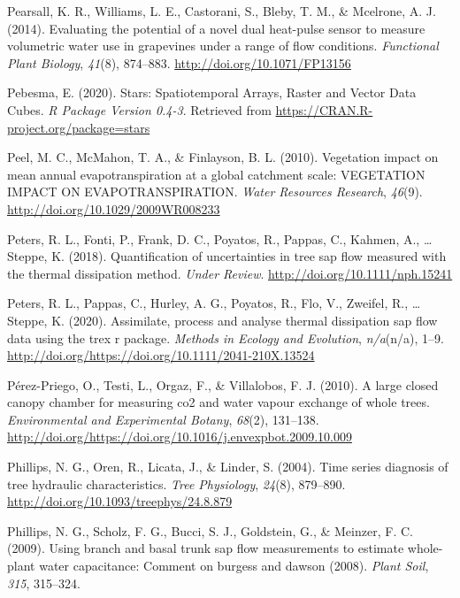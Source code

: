 \documentclass[11pt,twoside]{reedthesis}
\begin{document}
\hypertarget{ref-Pearsall2014}{}
Pearsall, K. R., Williams, L. E., Castorani, S., Bleby, T. M., \&
Mcelrone, A. J. (2014). Evaluating the potential of a novel dual
heat-pulse sensor to measure volumetric water use in grapevines under a
range of flow conditions. \emph{Functional Plant Biology}, \emph{41}(8),
874--883. \url{http://doi.org/10.1071/FP13156}

\hypertarget{ref-pebesma_stars_2020}{}
Pebesma, E. (2020). Stars: Spatiotemporal Arrays, Raster and Vector Data
Cubes. \emph{R Package Version 0.4-3}. Retrieved from
\url{https://CRAN.R-project.org/package=stars}

\hypertarget{ref-peel_vegetation_2010}{}
Peel, M. C., McMahon, T. A., \& Finlayson, B. L. (2010). Vegetation
impact on mean annual evapotranspiration at a global catchment scale:
VEGETATION IMPACT ON EVAPOTRANSPIRATION. \emph{Water Resources
Research}, \emph{46}(9). \url{http://doi.org/10.1029/2009WR008233}

\hypertarget{ref-Peters2018}{}
Peters, R. L., Fonti, P., Frank, D. C., Poyatos, R., Pappas, C., Kahmen,
A., \ldots{} Steppe, K. (2018). Quantification of uncertainties in tree
sap flow measured with the thermal dissipation method. \emph{Under
Review}. \url{http://doi.org/10.1111/nph.15241}

\hypertarget{ref-Richard2020}{}
Peters, R. L., Pappas, C., Hurley, A. G., Poyatos, R., Flo, V., Zweifel,
R., \ldots{} Steppe, K. (2020). Assimilate, process and analyse thermal
dissipation sap flow data using the trex r package. \emph{Methods in
Ecology and Evolution}, \emph{n/a}(n/a), 1--9.
\url{http://doi.org/https://doi.org/10.1111/2041-210X.13524}

\hypertarget{ref-Perezpriego2010}{}
Pérez-Priego, O., Testi, L., Orgaz, F., \& Villalobos, F. J. (2010). A
large closed canopy chamber for measuring co2 and water vapour exchange
of whole trees. \emph{Environmental and Experimental Botany},
\emph{68}(2), 131--138.
\url{http://doi.org/https://doi.org/10.1016/j.envexpbot.2009.10.009}

\hypertarget{ref-Phillips2004}{}
Phillips, N. G., Oren, R., Licata, J., \& Linder, S. (2004). Time series
diagnosis of tree hydraulic characteristics. \emph{Tree Physiology},
\emph{24}(8), 879--890. \url{http://doi.org/10.1093/treephys/24.8.879}

\hypertarget{ref-phillips2009}{}
Phillips, N. G., Scholz, F. G., Bucci, S. J., Goldstein, G., \& Meinzer,
F. C. (2009). Using branch and basal trunk sap flow measurements to
estimate whole-plant water capacitance: Comment on burgess and dawson
(2008). \emph{Plant Soil}, \emph{315}, 315--324.
\end{document}
